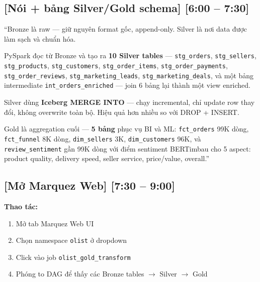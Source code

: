 \documentclass[12pt, a4paper]{article}
\newenvironment{speakerbox}[2]{%
  \begin{tcolorbox}[
    enhanced, breakable,
    colback=#1!6!white,
    colframe=#1,
    colbacktitle=#1,
    coltitle=white,
    fonttitle=\bfseries\large,
    title={#2},
    arc=4pt,
    boxrule=1.5pt,
    left=8pt, right=8pt, top=6pt, bottom=6pt,
  ]
}{%
  \end{tcolorbox}
}
\newcommand{\timing}[1]{%
  \hfill{\small\bfseries\color{gray}[#1]}%
}
\begin{document}
\begin{speakerbox}{p3color}{\faUser\ Người 3 · 6:00 -- 9:00}

\subsection*{[Nói + bảng Silver/Gold schema] \timing{6:00 -- 7:30}}

\begin{scriptbox}
``Bronze là raw --- giữ nguyên format gốc, append-only. Silver là nơi data được
làm sạch và chuẩn hóa.

PySpark đọc từ Bronze và tạo ra \textbf{10 Silver tables} ---
\texttt{stg\_orders}, \texttt{stg\_sellers}, \texttt{stg\_products},
\texttt{stg\_customers}, \texttt{stg\_order\_items}, \texttt{stg\_order\_payments},
\texttt{stg\_order\_reviews}, \texttt{stg\_marketing\_leads},
\texttt{stg\_marketing\_deals}, và một bảng intermediate
\texttt{int\_orders\_enriched} --- join 6 bảng lại thành một view enriched.

Silver dùng \textbf{Iceberg MERGE INTO} --- chạy incremental, chỉ update row thay đổi,
không overwrite toàn bộ. Hiệu quả hơn nhiều so với DROP + INSERT.

Gold là aggregation cuối --- \textbf{5 bảng} phục vụ BI và ML:
\texttt{fct\_orders} 99K dòng, \texttt{fct\_funnel} 8K dòng,
\texttt{dim\_sellers} 3K, \texttt{dim\_customers} 96K,
và \texttt{review\_sentiment} gần 99K dòng với điểm sentiment BERTimbau
cho 5 aspect: product quality, delivery speed, seller service, price/value, overall.''
\end{scriptbox}

\subsection*{[Mở Marquez Web] \timing{7:30 -- 9:00}}

\begin{demobox}
\textbf{Thao tác:}
\begin{enumerate}[leftmargin=1.5em, itemsep=2pt]
  \item Mở tab Marquez Web UI
  \item Chọn namespace \texttt{olist} ở dropdown
  \item Click vào job \texttt{olist\_gold\_transform}
  \item Phóng to DAG để thấy các Bronze tables $\to$ Silver $\to$ Gold
\end{enumerate}
\end{demobox}


\end{speakerbox}
\end{document}
